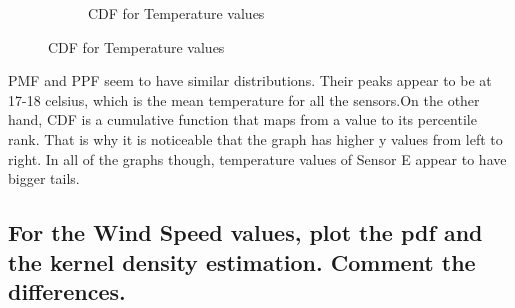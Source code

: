 \documentclass[a4paper,12pt]{article} %
\begin{document}
\begin{figure}[H]
\begin{subfigure}[b]{0.4\linewidth}
		\caption{CDF for Temperature values}
	\end{subfigure}
\end{figure}

PMF and PPF seem to have similar distributions. Their peaks appear to be at 17-18 celsius, which is the mean temperature for all the sensors.On the other hand, CDF is a cumulative function that maps from a value to its percentile rank. That is why it is noticeable that the graph has higher y values from left to right. In all of the graphs though, temperature values of Sensor E appear to have bigger tails.


\subsection{For the Wind Speed values, plot the pdf and the kernel density estimation. Comment the differences.}
\end{document}
